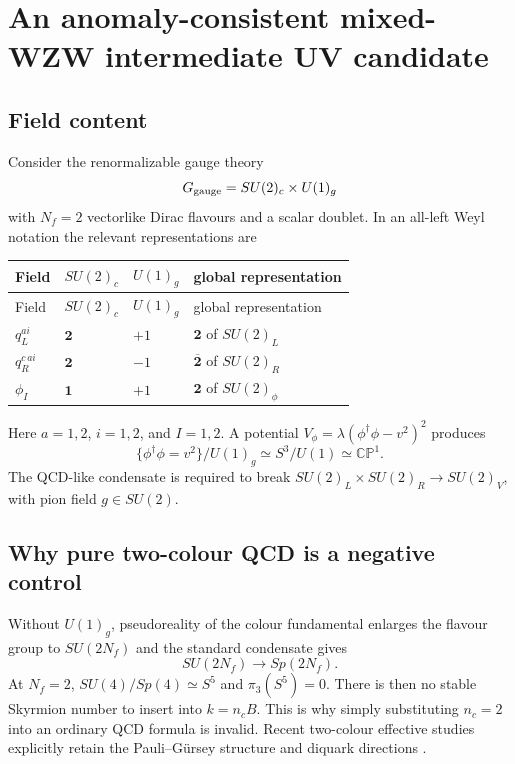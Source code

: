 \documentclass[11pt]{article}
\theoremstyle{definition}
\theoremstyle{remark}
\newcommand{\CP}{\mathbb {CP}}
\begin{document}
\section{An anomaly-consistent mixed-WZW intermediate UV candidate}

\subsection{Field content}

Consider the renormalizable gauge theory
\begin{equation}
 G_{\rm gauge}=SU(2)_c\times U(1)_g
 \label{eq:gauge-group}
\end{equation}
with \(N_f=2\) vectorlike Dirac flavours and a scalar doublet.  In an all-left
Weyl notation the relevant representations are
\begin{longtable}{@{}L{0.20\textwidth}L{0.20\textwidth}L{0.22\textwidth}L{0.27\textwidth}@{}}
\toprule
Field & \(SU(2)_c\) & \(U(1)_g\) & global representation\\
\midrule
\endfirsthead
\toprule
Field & \(SU(2)_c\) & \(U(1)_g\) & global representation\\
\midrule
\endhead
\(q_L^{ai}\) & \(\bm2\) & \(+1\) & \(\bm2\) of \(SU(2)_L\)\\
\(q_R^{c\,ai}\) & \(\bm2\) & \(-1\) & \(\overline{\bm2}\) of \(SU(2)_R\)\\
\(\phi_I\) & \(\bm1\) & \(+1\) & \(\bm2\) of \(SU(2)_\phi\)\\
\bottomrule
\end{longtable}
Here \(a=1,2\), \(i=1,2\), and \(I=1,2\).  A potential
\(V_\phi=\lambda(\phi^\dagger\phi-v^2)^2\) produces
\begin{equation}
 \{\phi^\dagger\phi=v^2\}/U(1)_g\simeq S^3/U(1)\simeq\CP^1.
 \label{eq:scalar-cp1}
\end{equation}
The QCD-like condensate is required to break
\(SU(2)_L\times SU(2)_R\to SU(2)_V\), with pion field
\(g\in SU(2)\).

\subsection{Why pure two-colour QCD is a negative control}

Without \(U(1)_g\), pseudoreality of the colour fundamental enlarges the
flavour group to \(SU(2N_f)\) and the standard condensate gives
\begin{equation}
 SU(2N_f)\longrightarrow Sp(2N_f).
 \label{eq:pg-breaking}
\end{equation}
At \(N_f=2\), \(SU(4)/Sp(4)\simeq S^5\) and
\(\pi_3(S^5)=0\).  There is then no stable Skyrmion number to insert into
\(k=n_cB\).  This is why simply substituting \(n_c=2\) into an ordinary
QCD formula is invalid.  Recent two-colour effective studies explicitly
retain the Pauli--G\"ursey structure and diquark directions
\cite{SuenagaEtAl2024APE3UV}.
\end{document}
